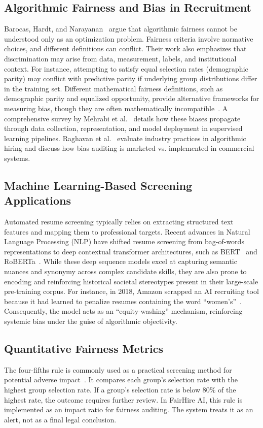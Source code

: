 \documentclass[sigconf]{acmart}
\begin{document}
\subsection{Algorithmic Fairness and Bias in Recruitment}
Barocas, Hardt, and Narayanan~\cite{barocas2023} argue that algorithmic fairness cannot be understood only as an optimization problem. Fairness criteria involve normative choices, and different definitions can conflict. Their work also emphasizes that discrimination may arise from data, measurement, labels, and institutional context. For instance, attempting to satisfy equal selection rates (demographic parity) may conflict with predictive parity if underlying group distributions differ in the training set. Different mathematical fairness definitions, such as demographic parity and equalized opportunity, provide alternative frameworks for measuring bias, though they are often mathematically incompatible~\cite{hardt2016}. A comprehensive survey by Mehrabi et al.~\cite{mehrabi2021} details how these biases propagate through data collection, representation, and model deployment in supervised learning pipelines. Raghavan et al.~\cite{raghavan2020} evaluate industry practices in algorithmic hiring and discuss how bias auditing is marketed vs. implemented in commercial systems.

\subsection{Machine Learning-Based Screening Applications}
Automated resume screening typically relies on extracting structured text features and mapping them to professional targets. Recent advances in Natural Language Processing (NLP) have shifted resume screening from bag-of-words representations to deep contextual transformer architectures, such as BERT~\cite{devlin2018} and RoBERTa~\cite{liu2019}. While these deep sequence models excel at capturing semantic nuances and synonymy across complex candidate skills, they are also prone to encoding and reinforcing historical societal stereotypes present in their large-scale pre-training corpus. For instance, in 2018, Amazon scrapped an AI recruiting tool because it had learned to penalize resumes containing the word ``women's''~\cite{dastin2018}. Consequently, the model acts as an ``equity-washing'' mechanism, reinforcing systemic bias under the guise of algorithmic objectivity.

\subsection{Quantitative Fairness Metrics}
The four-fifths rule is commonly used as a practical screening method for potential adverse impact~\cite{eeoc1978, pessach2020}. It compares each group's selection rate with the highest group selection rate. If a group's selection rate is below 80\% of the highest rate, the outcome requires further review. In FairHire AI, this rule is implemented as an impact ratio for fairness auditing. The system treats it as an alert, not as a final legal conclusion.
\end{document}
